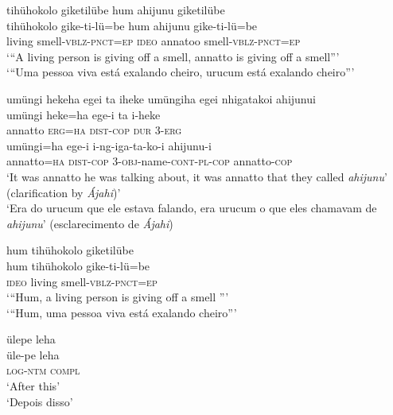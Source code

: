 \documentclass[output=paper,
modfonts,nonflat
]{langsci/langscibook}
\begin{document}
\newpage 
\ea tihühokolo giketilübe hum ahijunu giketilübe \\[.3em]
\gll tihühokolo	gike-ti-lü=be 			hum	ahijunu{\footnotemark}{}		gike-ti-lü=be \\
living 		smell-\textsc{vblz-pnct=ep} 	\textsc{ideo}	annatoo 	smell-\textsc{vblz-pnct=ep} \\
\glt ‘“A living person is giving off a smell, annatto is giving off a smell”’ \\
‘“Uma pessoa viva está exalando cheiro, urucum está exalando cheiro”’ \\
\z

\ea umüngi hekeha egei ta iheke umüngiha egei nhigatakoi ahijunui \\[.3em]
\gll umüngi heke=ha ege-i ta i-heke \\
annatto \textsc{erg=ha} \textsc{dist-cop} \textsc{dur} \textsc{3-erg} \\
\gll umüngi=ha	ege-i i-ng-iga-ta-ko-i	ahijunu-i \\
annatto=\textsc{ha} \textsc{dist-cop} 3-\textsc{obj}-name-\textsc{cont-pl-cop} annatto-\textsc{cop} \\
\glt ‘It was annatto he was talking about, it was annatto that they called \emph{ahijunu}' (clarification by \textit{Ájahi})’ \\
‘Era do urucum que ele estava falando, era urucum o que eles chamavam de \emph{ahijunu}’ (esclarecimento de \textit{Ájahi}) \\
\z

 
\ea hum tihühokolo giketilübe \\[.3em]
\gll hum	tihühokolo	gike-ti-lü=be \\
\textsc{ideo}	living 		smell\textsc{-vblz-pnct=ep} \\
\glt‘“Hum, a living person is giving off a smell
”’ \\
‘“Hum, uma pessoa viva está exalando cheiro”’ \\
\z

\ea ülepe		leha \\[.3em]
\gll üle-pe 		leha \\
\textsc{log-ntm}	\textsc{compl} \\
\glt ‘After this’ \\
‘Depois disso’ \\
\z
\end{document}
